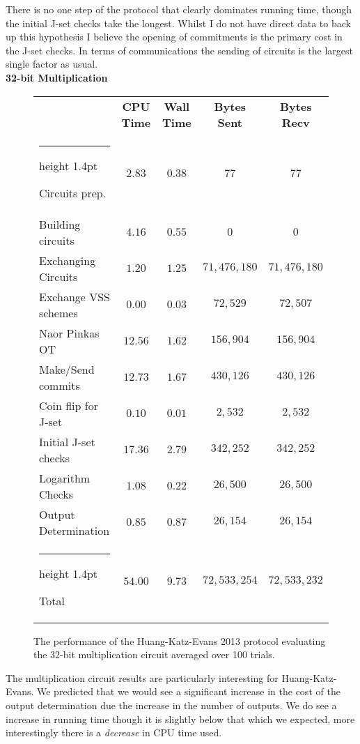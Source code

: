 \documentclass[11pt]{article} %
\makeatletter
\newcommand{\thickhline}{%
    \noalign {\ifnum 0=`}\fi \hrule height 1.4pt
    \futurelet \reserved@a \@xhline
}
\makeatother
\begin{document}
				There is no one step of the protocol that clearly dominates running time, though the initial J-set checks take the longest. Whilst I do not have direct data to back up this hypothesis I believe the opening of commitments is the primary cost in the J-set checks. In terms of communications the sending of circuits is the largest single factor as usual.\\

				\FloatBarrier
				\noindent \textbf{32-bit Multiplication}
				\begin{figure}[!ht]
					\begin{tabular}{| p{4.3cm} | c c c c |}
						\hline
						 & \textbf{CPU Time} & \textbf{Wall Time} & \textbf{Bytes Sent} & \textbf{Bytes Recv} \\
						\thickhline
						Circuits prep. & $2.83$ & $0.38$ & $77$ & $77$ \\
						\hline
						Building circuits & $4.16$ & $0.55$ & $0$ & $0$ \\
						\hline
						Exchanging Circuits & $1.20$ & $1.25$ & $71,476,180$ & $71,476,180$ \\
						\hline
						Exchange VSS schemes & $0.00$ & $0.03$ & $72,529$ & $72,507$ \\
						\hline
						Naor Pinkas OT & $12.56$ & $1.62$ & $156,904$ & $156,904$ \\
						\hline
						Make/Send commits & $12.73$ & $1.67$ & $430,126$ & $430,126$ \\
						\hline
						Coin flip for J-set & $0.10$ & $0.01$ & $2,532$ & $2,532$ \\
						\hline
						Initial J-set checks & $17.36$ & $2.79$ & $342,252$ & $342,252$ \\
						\hline
						Logarithm Checks & $1.08$ & $0.22$ & $26,500$ & $26,500$ \\
						\hline
						Output Determination & $0.85$ & $0.87$ & $26,154$ & $26,154$ \\
						\thickhline
						Total & $54.00$ & $9.73$ & $72,533,254$ & $72,533,232$ \\
						\hline
					\end{tabular}
					\caption{The performance of the Huang-Katz-Evans 2013 protocol evaluating the 32-bit multiplication circuit averaged over 100 trials.\label{table:HKE_2013_Mul}}
				\end{figure}

				The multiplication circuit results are particularly interesting for Huang-Katz-Evans. We predicted that we would see a significant increase in the cost of the output determination due the increase in the number of outputs. We do see a increase in running time though it is slightly below that which we expected, more interestingly there is a \emph{decrease} in CPU time used.\\
\end{document}
